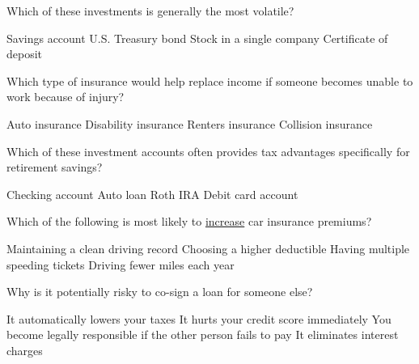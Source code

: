\documentclass[12pt]{exam}
\begin{document}
\begin{questions}
  \begin{mcquestion}[2]
    Which of these investments is generally the most volatile?
    \begin{choices}
      \choice Savings account
      \choice U.S. Treasury bond
      \CorrectChoice Stock in a single company
      \choice Certificate of deposit
    \end{choices}
  \end{mcquestion}

  \begin{mcquestion}[2]
    Which type of insurance would help replace income if someone becomes unable to work because of injury?
    \begin{choices}
      \choice Auto insurance
      \CorrectChoice Disability insurance
      \choice Renters insurance
      \choice Collision insurance
    \end{choices}
  \end{mcquestion}

  \begin{mcquestion}[2]
    Which of these investment accounts often provides tax advantages
    specifically for retirement savings?
    \begin{choices}
      \choice Checking account
      \choice Auto loan
      \CorrectChoice Roth IRA
      \choice Debit card account
    \end{choices}
  \end{mcquestion}

  \begin{mcquestion}[2]
    Which of the following is most likely to \underline{increase} car insurance premiums?
    \begin{choices}
      \choice Maintaining a clean driving record
      \choice Choosing a higher deductible
      \CorrectChoice Having multiple speeding tickets
      \choice Driving fewer miles each year
    \end{choices}
  \end{mcquestion}

  \begin{mcquestion}[2]
    Why is it potentially risky to co-sign a loan for someone else?
    \begin{choices}
      \choice It automatically lowers your taxes
      \choice It hurts your credit score immediately
      \CorrectChoice You become legally responsible if the other person fails to pay
      \choice It eliminates interest charges
    \end{choices}
  \end{mcquestion}


\end{questions}
\end{document}
